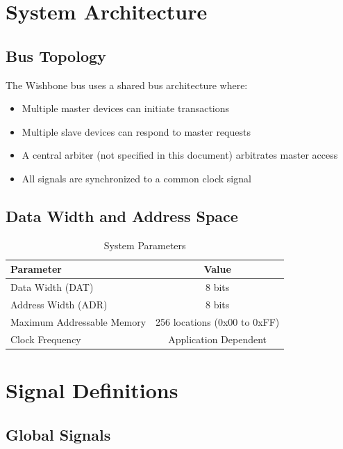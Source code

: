 \documentclass[12pt,a4paper]{article}
\begin{document}
\section{System Architecture}

\subsection{Bus Topology}
The Wishbone bus uses a shared bus architecture where:
\begin{itemize}
    \item Multiple master devices can initiate transactions
    \item Multiple slave devices can respond to master requests
    \item A central arbiter (not specified in this document) arbitrates master access
    \item All signals are synchronized to a common clock signal
\end{itemize}

\subsection{Data Width and Address Space}
\begin{table}[H]
    \centering
    \begin{tabular}{|l|c|}
        \hline
        \textbf{Parameter} & \textbf{Value} \\
        \hline
        Data Width (DAT) & 8 bits \\
        Address Width (ADR) & 8 bits \\
        Maximum Addressable Memory & 256 locations (0x00 to 0xFF) \\
        Clock Frequency & Application Dependent \\
        \hline
    \end{tabular}
    \caption{System Parameters}
\end{table}

\section{Signal Definitions}

\subsection{Global Signals}
\end{document}
